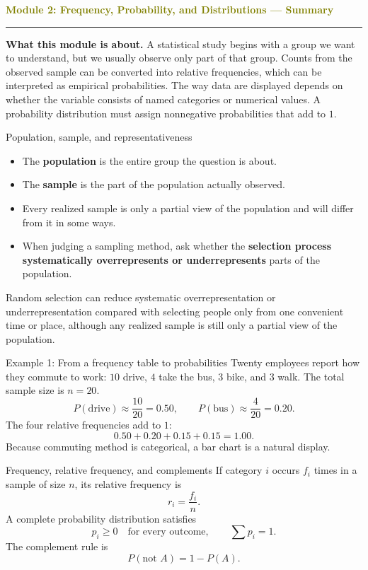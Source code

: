 \documentclass[11pt]{article}
\newcommand{\summaryhead}[2]{%
  \clearpage
  {\Large\bfseries\textcolor{olive}{Module #1: #2 — Summary}}\par
  \vspace{2pt}\textcolor{gold}{\rule{\linewidth}{1.2pt}}\par\smallskip
}
\begin{document}
\summaryhead{2}{Frequency, Probability, and Distributions}

\textbf{What this module is about.} A statistical study begins with a group we want to understand, but we usually observe only part of that group. Counts from the observed sample can be converted into relative frequencies, which can be interpreted as empirical probabilities. The way data are displayed depends on whether the variable consists of named categories or numerical values. A probability distribution must assign nonnegative probabilities that add to \(1\).

\begin{keybox}{Population, sample, and representativeness}
\begin{itemize}
\item The \textbf{population} is the entire group the question is about.
\item The \textbf{sample} is the part of the population actually observed.
\item Every realized sample is only a partial view of the population and will differ from it in some ways.
\item When judging a sampling method, ask whether the \textbf{selection process systematically overrepresents or underrepresents} parts of the population.
\end{itemize}
Random selection can reduce systematic overrepresentation or underrepresentation compared with selecting people only from one convenient time or place, although any realized sample is still only a partial view of the population.
\end{keybox}

\begin{examplebox}{Example 1: From a frequency table to probabilities}
Twenty employees report how they commute to work: \(10\) drive, \(4\) take the bus, \(3\) bike, and \(3\) walk. The total sample size is \(n=20\).
\[
P(\text{drive})\approx\frac{10}{20}=0.50,
\qquad
P(\text{bus})\approx\frac4{20}=0.20.
\]
The four relative frequencies add to \(1\):
\[
0.50+0.20+0.15+0.15=1.00.
\]
Because commuting method is categorical, a bar chart is a natural display.
\end{examplebox}

\begin{keybox}{Frequency, relative frequency, and complements}
If category \(i\) occurs \(f_i\) times in a sample of size \(n\), its relative frequency is
\[
r_i=\frac{f_i}{n}.
\]
A complete probability distribution satisfies
\[
p_i\ge0\quad\text{for every outcome},
\qquad
\sum p_i=1.
\]
The complement rule is
\[
P(\text{not }A)=1-P(A).
\]
\end{keybox}
\end{document}
